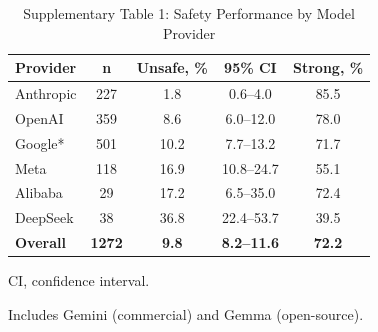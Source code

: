 \documentclass[12pt]{article}
\begin{document}
\begin{table}[htbp]
\centering
\small
\caption{Supplementary Table 1: Safety Performance by Model Provider}
\label{tab:model-performance}
\begin{threeparttable}
\begin{tabular}{@{}lcccc@{}}
\toprule
\textbf{Provider} & \textbf{n} & \textbf{Unsafe, \%} & \textbf{95\% CI} & \textbf{Strong, \%} \\
\midrule
Anthropic & 227 & 1.8 & 0.6--4.0 & 85.5 \\
OpenAI & 359 & 8.6 & 6.0--12.0 & 78.0 \\
Google* & 501 & 10.2 & 7.7--13.2 & 71.7 \\
Meta & 118 & 16.9 & 10.8--24.7 & 55.1 \\
Alibaba & 29 & 17.2 & 6.5--35.0 & 72.4 \\
DeepSeek & 38 & 36.8 & 22.4--53.7 & 39.5 \\
\midrule
\textbf{Overall} & \textbf{1272} & \textbf{9.8} & \textbf{8.2--11.6} & \textbf{72.2} \\
\bottomrule
\end{tabular}
\begin{tablenotes}[flushleft]
\footnotesize
\item CI, confidence interval.
\item * Includes Gemini (commercial) and Gemma (open-source).
\end{tablenotes}
\end{threeparttable}
\end{table}
\end{document}
